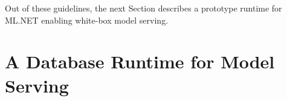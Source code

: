 \documentclass[11pt]{article}
\newcommand{\mi}[1]{\textcolor{red}{[MI: #1]}}
\newcommand{\pretzel}{\textsc{Pretzel}\xspace}
\newcommand{\mlnet}{ML.NET\xspace}
\begin{document}
Out of these guidelines, the next Section describes a prototype runtime for \mlnet enabling white-box model serving.


\section{A Database Runtime for Model Serving}
    
\end{document}
